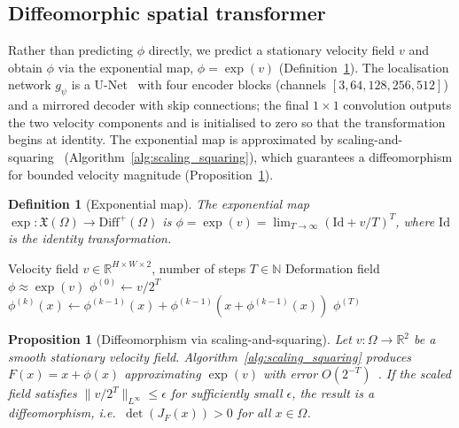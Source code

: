 \documentclass[pdflatex,sn-nature]{sn-jnl}%
\theoremstyle{thmstyleone}%
\newtheorem{proposition}[theorem]{Proposition}%
\theoremstyle{thmstyletwo}%
\theoremstyle{thmstylethree}%
\newtheorem{definition}{Definition}%
\begin{document}
\subsection{Diffeomorphic spatial transformer}

Rather than predicting $\phi$ directly, we predict a stationary velocity field
$v$ and obtain $\phi$ via the exponential map, $\phi=\exp(v)$
(Definition~\ref{def:exp_map}). The localisation network $g_\psi$ is a
U-Net~\cite{ronneberger2015unet} with four encoder blocks (channels
$[3,64,128,256,512]$) and a mirrored decoder with skip connections; the final
$1\times1$ convolution outputs the two velocity components and is initialised to
zero so that the transformation begins at identity. The exponential map is
approximated by scaling-and-squaring~\cite{arsigny2006logdiff}
(Algorithm~\ref{alg:scaling_squaring}), which guarantees a diffeomorphism for
bounded velocity magnitude (Proposition~\ref{prop:diffeomorphism}).

\begin{definition}[Exponential map]
\label{def:exp_map}
The exponential map $\exp:\mathfrak{X}(\Omega)\rightarrow\text{Diff}^+(\Omega)$ is
$\phi=\exp(v)=\lim_{T\rightarrow\infty}\left(\text{Id}+v/T\right)^T$, where
$\text{Id}$ is the identity transformation.
\end{definition}

\begin{algorithm}[t]
\caption{Scaling-and-Squaring for Diffeomorphic Integration}
\label{alg:scaling_squaring}
\begin{algorithmic}[1]
\REQUIRE Velocity field $v \in \mathbb{R}^{H \times W \times 2}$, number of steps $T \in \mathbb{N}$
\ENSURE Deformation field $\phi \approx \exp(v)$
\STATE $\phi^{(0)} \leftarrow v / 2^T$ \quad {}
    \STATE $\phi^{(k)}(x) \leftarrow \phi^{(k-1)}(x) + \phi^{(k-1)}(x + \phi^{(k-1)}(x))$ \quad {}
\ENDFOR
\RETURN $\phi^{(T)}$
\end{algorithmic}
\end{algorithm}


\begin{proposition}[Diffeomorphism via scaling-and-squaring]
\label{prop:diffeomorphism}
Let $v:\Omega\rightarrow\mathbb{R}^2$ be a smooth stationary velocity field.
Algorithm~\ref{alg:scaling_squaring} produces $F(x)=x+\phi(x)$ approximating
$\exp(v)$ with error $O(2^{-T})$~\cite{arsigny2006logdiff}. If the scaled field
satisfies $\|v/2^T\|_{L^\infty}\leq\epsilon$ for sufficiently small $\epsilon$,
the result is a diffeomorphism, i.e.\ $\det(J_F(x))>0$ for all $x\in\Omega$.
\end{proposition}
\end{document}
